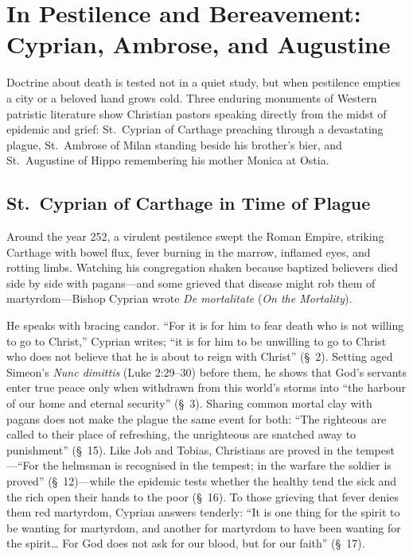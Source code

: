 \section{In Pestilence and Bereavement: Cyprian, Ambrose, and Augustine}

Doctrine about death is tested not in a quiet study, but when pestilence empties a city or a beloved hand grows cold. Three enduring monuments of Western patristic literature show Christian pastors speaking directly from the midst of epidemic and grief: St.~Cyprian of Carthage preaching through a devastating plague, St.~Ambrose of Milan standing beside his brother's bier, and St.~Augustine of Hippo remembering his mother Monica at Ostia.

\subsection{St.~Cyprian of Carthage in Time of Plague}

Around the year 252, a virulent pestilence swept the Roman Empire, striking Carthage with bowel flux, fever burning in the marrow, inflamed eyes, and rotting limbs. Watching his congregation shaken because baptized believers died side by side with pagans---and some grieved that disease might rob them of martyrdom---Bishop Cyprian wrote \emph{De mortalitate} (\emph{On the Mortality}).

He speaks with bracing candor. ``For it is for him to fear death who is not willing to go to Christ,'' Cyprian writes; ``it is for him to be unwilling to go to Christ who does not believe that he is about to reign with Christ'' (\S~2). Setting aged Simeon's \emph{Nunc dimittis} (Luke 2:29--30) before them, he shows that God's servants enter true peace only when withdrawn from this world's storms into ``the harbour of our home and eternal security'' (\S~3). Sharing common mortal clay with pagans does not make the plague the same event for both: ``The righteous are called to their place of refreshing, the unrighteous are snatched away to punishment'' (\S~15). Like Job and Tobias, Christians are proved in the tempest---``For the helmsman is recognised in the tempest; in the warfare the soldier is proved'' (\S~12)---while the epidemic tests whether the healthy tend the sick and the rich open their hands to the poor (\S~16). To those grieving that fever denies them red martyrdom, Cyprian answers tenderly: ``It is one thing for the spirit to be wanting for martyrdom, and another for martyrdom to have been wanting for the spirit\ldots{} For God does not ask for our blood, but for our faith'' (\S~17).

